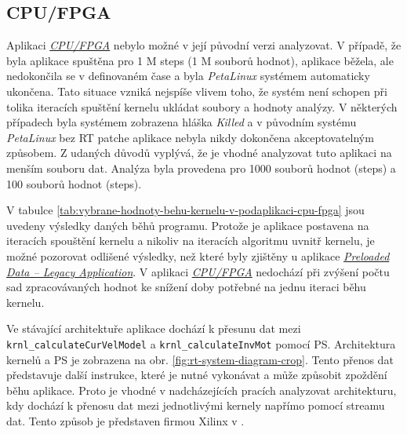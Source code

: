 \documentclass[a4paper, twoside, 11pt]{article}
\newcommand{\fbar}{\FloatBarrier}
\begin{document}
	\fbar
	\subsection{CPU/FPGA}\label{subsec:dosazene-vysledky-cpu-fpga}
		Aplikaci \hyperref[subsec:cpu-fpga]{\textit{CPU/FPGA}} nebylo možné v její původní verzi analyzovat. V případě, že byla aplikace spuštěna pro 1 M steps (1 M souborů hodnot), aplikace běžela, ale nedokončila se v definovaném čase a byla \textit{PetaLinux} systémem automaticky ukončena. Tato situace vzniká nejspíše vlivem toho, že systém není schopen při tolika iteracích spuštění kernelu ukládat soubory a hodnoty analýzy. V některých případech byla systémem zobrazena hláška \textit{Killed} a v původním systému \textit{PetaLinux} bez RT patche aplikace nebyla nikdy dokončena akceptovatelným způsobem. Z udaných důvodů vyplývá, že je vhodné analyzovat tuto aplikaci na menším souboru dat. Analýza byla provedena pro 1000 souborů hodnot (steps) a 100 souborů hodnot (steps).\par
		V tabulce \ref{tab:vybrane-hodnoty-behu-kernelu-v-podaplikaci-cpu-fpga} jsou uvedeny výsledky daných běhů programu. Protože je aplikace postavena na iteracích spouštění kernelu a nikoliv na iteracích algoritmu uvnitř kernelu, je možné pozorovat odlišené výsledky, než které byly zjištěny u aplikace \hyperref[subsec:dosazene-vysledky-preloaded-data-legacy-application]{\textit{Preloaded Data – Legacy Application}}. V aplikaci \hyperref[subsec:cpu-fpga]{\textit{CPU/FPGA}} nedochází při zvýšení počtu sad zpracovávaných hodnot ke snížení doby potřebné na jednu iteraci běhu kernelu.\par
		Ve stávající architektuře aplikace dochází k přesunu dat mezi \texttt{ krnl\_calculateCurVelModel} a \texttt{krnl\_calculateInvMot} pomocí PS. Architektura kernelů a PS je zobrazena na obr. \ref{fig:rt-system-diagram-crop}. Tento přenos dat představuje další instrukce, které je nutné vykonávat a může způsobit zpoždění běhu aplikace. Proto je vhodné v nadcházejících pracích analyzovat architekturu, kdy dochází k přenosu dat mezi jednotlivými kernely napřímo pomocí streamu dat. Tento způsob je představen firmou Xilinx v \cite{xilinx-github-vitis-accel-examples-stream-free-running-kernel}.\par


		
\end{document}
